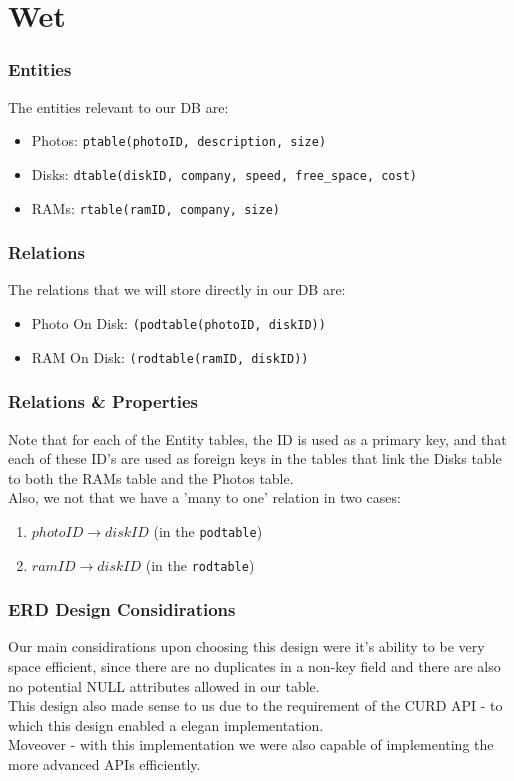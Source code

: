 \part{Wet}
\section{Entities}
The entities relevant to our DB are:
\begin{itemize}
	\item Photos: \texttt{ptable(photoID, description, size)}
	\item Disks: \texttt{dtable(diskID, company, speed, free\_space, cost)}
	\item RAMs: \texttt{rtable(ramID, company, size)}
\end{itemize}

\section{Relations}
The relations that we will store directly in our DB are:
\begin{itemize}
	\item Photo On Disk: \texttt{(podtable(photoID, diskID))}
	\item RAM On Disk: \texttt{(rodtable(ramID, diskID))}
\end{itemize}

\section{Relations \& Properties}
Note that for each of the Entity tables, the ID is used
as a primary key, and that each of these ID's are used
as foreign keys in the tables that link the Disks table to both
the RAMs table and the Photos table.\\
Also, we not that we have a 'many to one' relation in two cases:
\begin{enumerate}
	\item $photoID \longrightarrow diskID$ (in the \texttt{podtable})
	\item $ramID \longrightarrow diskID$ (in the \texttt{rodtable})
\end{enumerate}

\section{ERD Design Considirations}
Our main considirations upon choosing this design were
it's ability to be very space efficient, since there are
no duplicates in a non-key field and there are also no
potential NULL attributes allowed in our table.\\
This design also made sense to us due to
the requirement of the CURD API - to which this design
enabled a elegan implementation.\\
Moveover - with this implementation we were also
capable of implementing the more advanced APIs efficiently.

